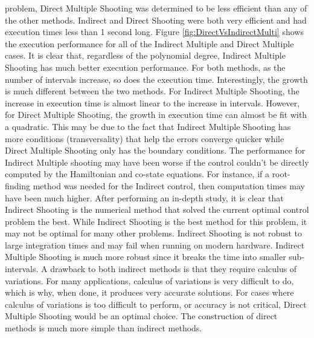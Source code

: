 \documentclass[]{article}
\begin{document}
problem, Direct Multiple Shooting was determined to be less efficient than any of the other methods. Indirect and Direct Shooting were both very efficient and had execution times less than 1 second long. Figure \ref{fig:DirectVsIndirectMulti} shows the execution performance for all of the Indirect Multiple and Direct Multiple cases. It is clear that, regardless of the polynomial degree, Indirect Multiple Shooting has much better execution performance. For both methods, as the number of intervals increase, so does the execution time. Interestingly, the growth is much different between the two methods. For Indirect Multiple Shooting, the increase in execution time is almost linear to the increase in intervals. However, for Direct Multiple Shooting, the growth in execution time can almost be fit with a quadratic. This may be due to the fact that Indirect Multiple Shooting has more conditions (transversality) that help the errors converge quicker while Direct Multiple Shooting only has the boundary conditions. The performance for Indirect Multiple shooting may have been worse if the control couldn't be directly computed by the Hamiltonian and co-state equations. For instance, if a root-finding method was needed for the Indirect control, then computation times may have been much higher. 
\vspace{2mm}\newline 
After performing an in-depth study, it is clear that Indirect Shooting is the numerical method that solved the current optimal control problem the best. While Indirect Shooting is the best method for this problem, it may not be optimal for many other problems. Indirect Shooting is not robust to large integration times and may fail when running on modern hardware. Indirect Multiple Shooting is much more robust since it breaks the time into smaller sub-intervals. A drawback to both indirect methods is that they require calculus of variations. For many applications, calculus of variations is very difficult to do, which is why, when done, it produces very accurate solutions. For cases where calculus of variations is too difficult to perform, or accuracy is not critical, Direct Multiple Shooting would be an optimal choice. The construction of direct methods is much more simple than indirect methods.
\end{document}
